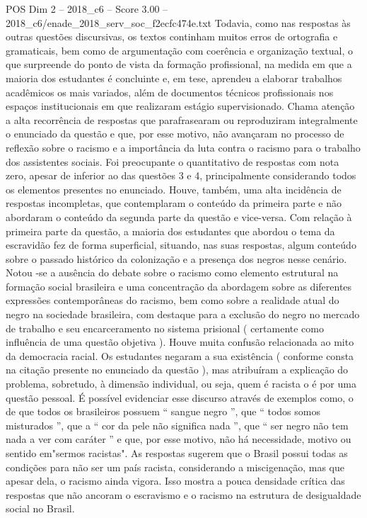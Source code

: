 \begin{textsample}{POS Dim 2 – 2018\_c6 – Score 3.00 – 2018\_c6/enade\_2018\_serv\_soc\_f2ecfc474e.txt}
Todavia, como nas respostas às outras questões discursivas, os textos continham muitos erros de ortografia e gramaticais, bem como de argumentação com coerência e organização textual, o que surpreende do ponto de vista da formação profissional, na medida em que a maioria dos estudantes é concluinte e, em tese, aprendeu a elaborar trabalhos acadêmicos os mais variados, além de documentos técnicos profissionais nos espaços institucionais em que realizaram estágio supervisionado.
Chama atenção a alta recorrência de respostas que parafrasearam ou reproduziram integralmente o enunciado da questão e que, por esse motivo, não avançaram no processo de reflexão sobre o racismo e a importância da luta contra o racismo para o trabalho dos assistentes sociais.
Foi preocupante o quantitativo de respostas com nota zero, apesar de inferior ao das questões 3 e 4, principalmente considerando todos os elementos presentes no enunciado.
Houve, também, uma alta incidência de respostas incompletas, que contemplaram o conteúdo da primeira parte e não abordaram o conteúdo da segunda parte da questão e vice-versa.
Com relação à primeira parte da questão, a maioria dos estudantes que abordou o tema da escravidão fez de forma superficial, situando, nas suas respostas, algum conteúdo sobre o passado histórico da colonização e a presença dos negros nesse cenário.
Notou -se a ausência do debate sobre o racismo como elemento estrutural na formação social brasileira e uma concentração da abordagem sobre as diferentes expressões contemporâneas do racismo, bem como sobre a realidade atual do negro na sociedade brasileira, com destaque para a exclusão do negro no mercado de trabalho e seu encarceramento no sistema prisional ( certamente como influência de uma questão objetiva ).
Houve muita confusão relacionada ao mito da democracia racial.
Os estudantes negaram a sua existência ( conforme consta na citação presente no enunciado da questão ), mas atribuíram a explicação do problema, sobretudo, à dimensão individual, ou seja, quem é racista o é por uma questão pessoal.
É possível evidenciar esse discurso através de exemplos como, o de que todos os brasileiros possuem “ sangue negro ”, que “ todos somos misturados ”, que a “ cor da pele não significa nada ”, que “ ser negro não tem nada a ver com caráter ” e que, por esse motivo, não há necessidade, motivo ou sentido em"sermos racistas".
As respostas sugerem que o Brasil possui todas as condições para não ser um país racista, considerando a miscigenação, mas que apesar dela, o racismo ainda vigora.
Isso mostra a pouca densidade crítica das respostas que não ancoram o escravismo e o racismo na estrutura de desigualdade social no Brasil.

\end{textsample}
